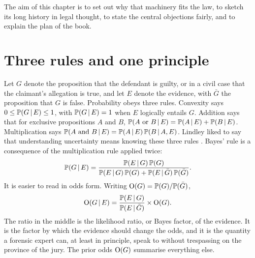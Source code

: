 The aim of this chapter is to set out why that machinery fits the law, to sketch its long history in legal thought, to state the central objections fairly, and to explain the plan of the book.

\section{Three rules and one principle}

Let $G$ denote the proposition that the defendant is guilty, or in a civil case that the claimant's allegation is true, and let $E$ denote the evidence, with $\bar G$ the proposition that $G$ is false. Probability obeys three rules. Convexity says $0 \le \mathbb{P}(G \,\vert\, E) \le 1$, with $\mathbb{P}(G\,\vert\, E) = 1$ when $E$ logically entails $G$. Addition says that for exclusive propositions $A$ and $B$, $\mathbb{P}(A \text{ or } B \,\vert\, E) = \mathbb{P}(A\,\vert\, E)+\mathbb{P}(B\,\vert\, E)$. Multiplication says $\mathbb{P}(A \text{ and } B \,\vert\, E) = \mathbb{P}(A \,\vert\, E)\,\mathbb{P}(B\,\vert\, A, E)$. Lindley liked to say that understanding uncertainty means knowing these three rules \citep{lindley2006}. Bayes' rule is a consequence of the multiplication rule applied twice:
\begin{equation}
\mathbb{P}(G \,\vert\, E) = \frac{\mathbb{P}(E\,\vert\, G)\,\mathbb{P}(G)}{\mathbb{P}(E\,\vert\, G)\,\mathbb{P}(G) + \mathbb{P}(E\,\vert\, \bar G)\,\mathbb{P}(\bar G)} .
\label{eq:bayes}
\end{equation}
It is easier to read in odds form. Writing $\mathrm{O}(G) = \mathbb{P}(G)/\mathbb{P}(\bar G)$,
\begin{equation}
\mathrm{O}(G \,\vert\, E) = \frac{\mathbb{P}(E\,\vert\, G)}{\mathbb{P}(E\,\vert\, \bar G)} \times \mathrm{O}(G).
\label{eq:oddsform}
\end{equation}
The ratio in the middle is the likelihood ratio, or Bayes factor, of the evidence. It is the factor by which the evidence should change the odds, and it is the quantity a forensic expert can, at least in principle, speak to without trespassing on the province of the jury. The prior odds $\mathrm{O}(G)$ summarise everything else.

